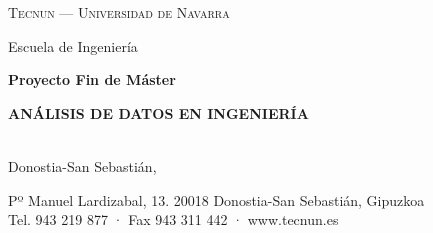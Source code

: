 \begin{titlepage}
\centering


{\large\scshape Tecnun --- Universidad de Navarra}

{\small Escuela de Ingeniería}

\vspace{2.5em}
{\bfseries Proyecto Fin de Máster}

\vspace{1.5em}
{\large\bfseries ANÁLISIS DE DATOS EN INGENIERÍA}

\vspace{6em}
{\LARGE\bfseries \tituloTFM \par}

\vspace{10em}
\begin{flushright}
  {\large \autorTFM}\\[0.4em]
  {\large Donostia-San Sebastián, \fechaTFM}
\end{flushright}

\vfill
{\footnotesize Pº Manuel Lardizabal, 13. 20018 Donostia-San Sebastián, Gipuzkoa\\
Tel. 943 219 877 · Fax 943 311 442 · www.tecnun.es}

\end{titlepage}
